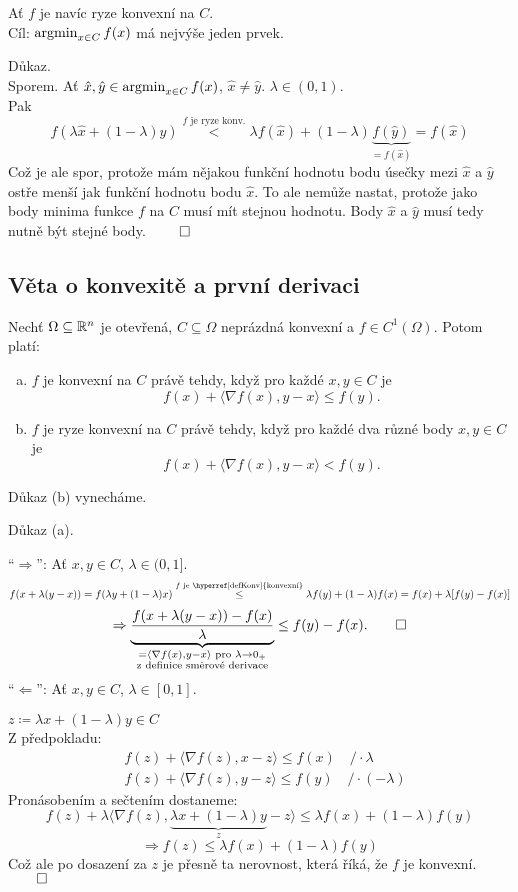 Ať $f$ je navíc ryze konvexní na $C$.\\
Cíl: $\operatorname*{argmin}_{x \in C} f(x)$ má nejvýše jeden prvek.

Důkaz.\\
Sporem. Ať $\hat x, \hat y \in \operatorname*{argmin}_{x \in C} f(x)$, $\hat x \not=\hat y$. $\lambda \in (0,1)$.\\
Pak
\[
    f(\lambda \hat x  + (1-\lambda) \hat y) \overset{f \text{ je ryze konv.}}{<} \lambda f(\hat x) + (1-\lambda)
    \underbrace{f(\hat y)}_{= f(\hat x)} = f(\hat x)
\]
Což je ale spor, protože mám nějakou funkční hodnotu bodu úsečky mezi $\hat x$ a $\hat y$ ostře menší jak funkční
hodnotu bodu $\hat x$. To ale nemůže nastat, protože jako body minima funkce $f$ na $C$ musí mít stejnou hodnotu. Body
$\hat x$ a $\hat y$ musí tedy nutně být stejné body. $\qed$

\subsection{Věta o konvexitě a první derivaci}\label{konvDeriv} %
Nechť $\Omega \subseteq \mathbb{R}^n$ je otevřená, $C \subseteq \Omega$ neprázdná konvexní a $f \in C^{1} (\Omega)$. Potom
platí:
\begin{enumerate}[(a)]
    \item $f$ je konvexní na $C$ právě tehdy, když pro každé $x, y \in C$ je
    \[
        f(x) + \langle \nabla f(x), y-x\rangle \leq f(y).
    \]
    \item $f$ je ryze konvexní na $C$ právě tehdy, když pro každé dva různé body $x, y \in C$ je
    \[
        f(x) + \langle \nabla f(x), y-x\rangle < f(y).
    \]
\end{enumerate}
Důkaz (b) vynecháme.

Důkaz (a).

\enquote{$\Rightarrow$}: Ať $x, y \in C$, $\lambda \in (0,1]$.
\[
    f(x + \lambda (y-x)) = f(\lambda y + (1-\lambda)x) \overset{f \text{ je \hyperref[defKonv]{konvexní}}}{\leq}
    \lambda f(y) + (1 - \lambda)f(x) = f(x) + \lambda [f(y) - f(x)]
\]
\[
    \Rightarrow \underbrace {\frac {f(x + \lambda (y-x)) - f(x)}{\lambda}}_{\substack{{ = \langle \nabla f(x),
    y-x\rangle \text{ pro } \lambda \rightarrow 0_+}\\{\text{z definice směrové derivace}}}} \leq f(y) - f(x). \qed
\]
\enquote{$\Leftarrow$}: Ať $x, y \in C$, $\lambda \in [0,1]$.

$z \coloneq \lambda x + (1-\lambda) y \in C$\\
Z předpokladu:
\begin{align*}
    & f(z) + \langle \nabla f(z), x - z\rangle \leq f(x) \quad / \cdot \lambda \\
    & f(z) + \langle \nabla f(z), y - z\rangle \leq f(y) \quad / \cdot (- \lambda)
\end{align*}
Pronásobením a sečtením dostaneme:
\[
    f(z) + \lambda \langle \nabla f(z), \underbrace{\lambda x + (1-\lambda)y}_{z} - z\rangle \leq \lambda f(x) +
    (1-\lambda)f(y)
\]
\[
    \Rightarrow f(z) \leq \lambda f(x) + (1-\lambda)f(y)
\]
Což ale po dosazení za $z$ je přesně ta nerovnost, která říká, že $f$ je konvexní. $\qed$

